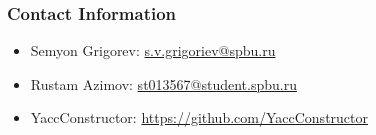 \documentclass[xcolor=table]{beamer}
\begin{document}
\begin{frame}
\transwipe[direction=90]
\frametitle{Contact Information}
\begin{itemize}
  \item Semyon Grigorev: \href{mailto:s.v.grigoriev@spbu.ru}{s.v.grigoriev@spbu.ru}
  \item Rustam Azimov: \href{mailto:st013567@student.spbu.ru}{st013567@student.spbu.ru}
\end{itemize}
\begin{itemize}
  \item YaccConstructor: \href{https://github.com/YaccConstructor}{https://github.com/YaccConstructor}
\end{itemize}
\end{frame}
\end{document}
